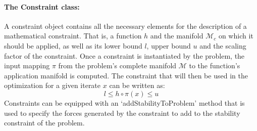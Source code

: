 \paragraph{The Constraint class:}
A constraint object contains all the necessary elements for the description of a mathematical constraint.
That is, a function $h$ and the manifold $\mathcal{M}_c$ on which it should be applied, as well as its lower bound $l$, upper bound $u$ and the scaling factor of the constraint.
Once a constraint is instantiated by the problem, the input mapping $\pi$ from the problem's complete manifold $\mathcal{M}$ to the function's application manifold is computed.
The constraint that will then be used in the optimization for a given iterate $x$ can be written as:
\begin{equation}
  l \leq h\circ\pi(x) \leq u
\end{equation}
Constraints can be equipped with an `addStabilityToProblem' method that is used to specify the forces generated by the constraint to add to the stability constraint of the problem.


